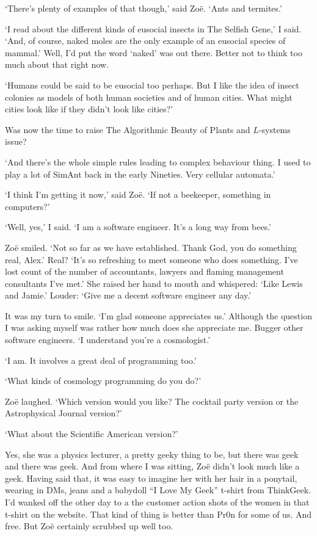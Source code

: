 `There's plenty of examples of that though,' said Zo{\"e}. `Ants and termites.'

`I read about the different kinds of eusocial insects in {\twelvesl The Selfish Gene},' I said. `And, of course, naked moles are the only example of an eusocial species of mammal.' Well, I'd put the word `naked' was out there. Better not to think too much about that right now.

`Humans could be said to be eusocial too perhaps. But I like the idea of insect colonies as models of both human societies and of human cities. What might cities look like if they didn't look like cities?'

Was now the time to raise {\twelvesl The Algorithmic Beauty of Plants} and $L$-systems issue?

`And there's the whole simple rules leading to complex behaviour thing. I used to play a lot of {\twelvesl SimAnt\/} back in the early Nineties. Very cellular automata.'

`I think I'm getting it now,' said Zo{\"e}. `If not a beekeeper, something in computers?'

`Well, yes,' I said. `I am a software engineer. It's a long way from bees.'

Zo{\"e} smiled. `Not so far as we have established. Thank God, you do something real, Alex.' Real? `It's so
refreshing to meet someone who does something. I've lost count of the
number of accountants, lawyers and flaming management consultants I've
met.' She raised her hand to mouth and whispered: `Like Lewis
and Jamie.' Louder: `Give me a decent software engineer any day.'

It was my turn to smile. `I'm glad someone appreciates us.'
Although the question I was asking myself was rather how much does
she appreciate {\twelveit me}. Bugger other software engineers. `I
understand you're a cosmologist.'

`I am. It involves a great deal of programming too.'

`What kinds of cosmology programming do you do?'

Zo{\"e} laughed. `Which version would you like? The cocktail party
version or the {\twelvesl Astrophysical Journal\/} version?'

`What about the {\twelvesl Scientific American\/} version?'

Yes, she was a physics lecturer, a pretty geeky thing to be, but
there was geek and there was geek. And from where I was sitting,
Zo{\"e} didn't look much like a geek. Having said that, it was easy
to imagine her with her hair in a ponytail, wearing in DMs, jeans and a
babydoll ``I Love My Geek'' t-shirt from ThinkGeek. I'd wanked off the other day to a
the customer action shots of the women in that t-shirt on the website.
That kind of thing is better than Pr0n for some of us. And free. But
Zo{\"e} certainly scrubbed up well too.

